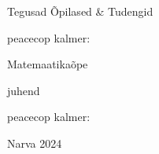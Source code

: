 \begin{titlepage}
\par{Tegusad Õpilased \& Tudengid}
\vspace{0.3\textheight}
\par{peacecop kalmer:}
\LARGE
\par{Matemaatikaõpe}
\normalsize
\par{juhend}
\vspace{0.3\textheight}
\begin{flushright}
\par{peacecop kalmer:}
\end{flushright}
\vfill
Narva
\hfill
2024
\end{titlepage}
